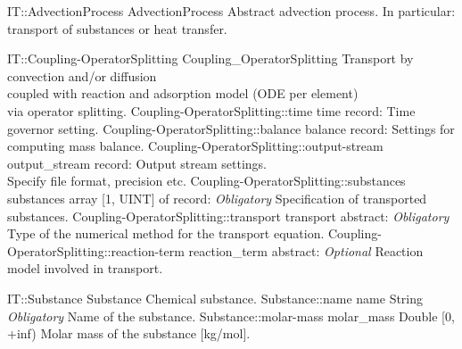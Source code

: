 \begin{AbstractType}
	{IT::AdvectionProcess}
	{AdvectionProcess}
	{}
	{{{Abstract advection process.
In particular: transport of substances or heat transfer.}%
}}
\end{AbstractType}
\begin{RecordType}
	{IT::Coupling-OperatorSplitting}
	{Coupling{\_}OperatorSplitting}
	{}%
	{}%
	{{{Transport by convection and/or diffusion}\\{
coupled with reaction and adsorption model (ODE per element)}\\{
 via operator splitting.}%
}}
		\RecKey
			{Coupling-OperatorSplitting::time}
			{time}
			{{record: }}{}
			{ \ValueDefault{{\{}{\}}}}
			{{{Time governor setting.}%
}}
		\RecKey
			{Coupling-OperatorSplitting::balance}
			{balance}
			{{record: }}{}
			{ \ValueDefault{{\{}{\}}}}
			{{{Settings for computing mass balance.}%
}}
		\RecKey
			{Coupling-OperatorSplitting::output-stream}
			{output{\_}stream}
			{{record: }}{}
			{ \ValueDefault{{\{}{\}}}}
			{{{Output stream settings.}\\{
 Specify file format, precision etc.}%
}}
		\RecKey
			{Coupling-OperatorSplitting::substances}
			{substances}
			{{array [1, UINT] of }{record: }}{}
			{ \it{Obligatory}}
			{{{Specification of transported substances.}%
}}
		\RecKey
			{Coupling-OperatorSplitting::transport}
			{transport}
			{{abstract: }}{}
			{ \it{Obligatory}}
			{{{Type of the numerical method for the transport equation.}%
}}
		\RecKey
			{Coupling-OperatorSplitting::reaction-term}
			{reaction{\_}term}
			{{abstract: }}{}
			{ \it{Optional}}
			{{{Reaction model involved in transport.}%
}}
\end{RecordType}
\begin{RecordType}
	{IT::Substance}
	{Substance}
	{}%
	{}%
	{{{Chemical substance.}%
}}
		\RecKey
			{Substance::name}
			{name}
			{{String}}{}
			{ \it{Obligatory}}
			{{{Name of the substance.}%
}}
		\RecKey
			{Substance::molar-mass}
			{molar{\_}mass}
			{{Double [0, +inf)}}{}
			{ }
			{{{Molar mass of the substance [kg/mol].}%
}}
\end{RecordType}
